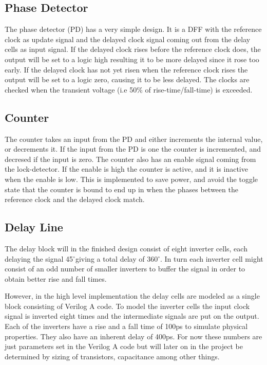 \documentclass[a4paper,12pt]{article} \usepackage{graphicx}
\newcommand{\degree}{\ensuremath{^\circ}}
\begin{document}
\subsection{Phase Detector}
The phase detector (PD) has a very simple design. It is a DFF with the
reference clock as update signal and the delayed clock signal coming
out from the delay cells as input signal. If the delayed clock rises before
the reference clock does, the output will be set to a logic high resulting it to 
be more delayed since it rose too early. If the delayed clock has not yet risen 
when the reference clock rises the output will be set to a logic zero, causing 
it to be less delayed. The clocks are checked when the transient voltage (i.e 50\% 
of rise-time/fall-time) is exceeded.
 
\subsection{Counter}
The counter takes an input from the PD and either increments
the internal value, or decrements it. If the input from the PD is one the
counter is incremented, and decresed if the input is zero. The counter also has
an enable signal coming from the lock-detector. If the enable is high the counter
is active, and it is inactive when the enable is low. This is implemented to 
save power, and avoid the toggle state that the counter is bound to end up in when
the phases between the reference clock and the delayed clock match.


\subsection{Delay Line}
The delay block will in the finished design consist of eight inverter cells,
each delaying the signal 45\degree giving a total delay of 360\degree. In turn
each inverter cell might consist of an odd number of smaller inverters to buffer
the signal in order to obtain better rise and fall times.

However, in the high level implementation the delay cells are modeled
as a single block consisting of Verilog A code. To model the inverter
cells the input clock signal is inverted eight times and the intermediate
signals are put on the output. Each of the inverters have a rise and a
fall time of 100ps to simulate physical properties. They also have an
inherent delay of 400ps. For now these numbers are just parameters set
in the Verilog A code but will later on in the project be determined
by sizing of transistors, capacitance among other things.
\end{document}
